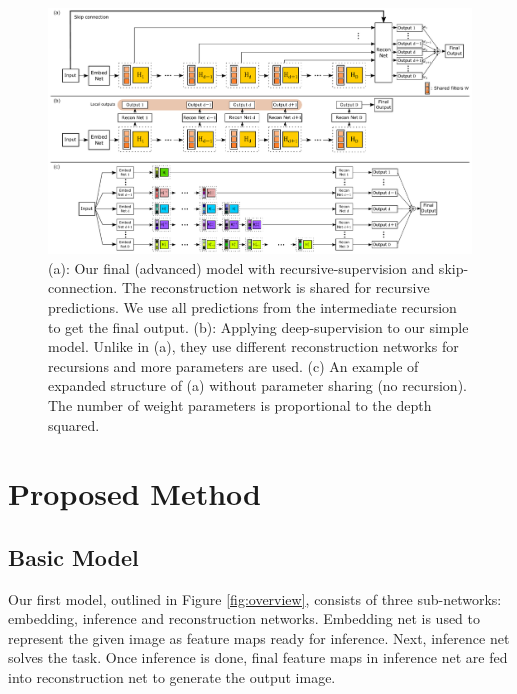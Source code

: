 \documentclass[10pt,twocolumn,letterpaper]{article}
\begin{document}
\begin{figure}[t]
\begin{center}
	\includegraphics[width=\textwidth]{figs/f3}
	\caption{(a): Our final (advanced) model with recursive-supervision and skip-connection. The reconstruction network is shared for recursive predictions. We use all predictions from the intermediate recursion to get the final output. (b): Applying deep-supervision \cite{lee2014deeply} to our simple model. Unlike in (a), they use different reconstruction networks for recursions and more parameters are used.  (c) An example of expanded structure of (a) without parameter sharing (no recursion). The number of weight parameters is proportional to the depth squared. }
\label{fig:recursive_supervision}
\end{center}
\end{figure}

\section{Proposed Method}
\subsection{Basic Model}

Our first model, outlined in Figure \ref{fig:overview}, consists of three sub-networks: embedding, inference and reconstruction networks. Embedding net is used to represent the given image as feature maps ready for inference. Next, inference net solves the task. Once inference is done, final feature maps in inference net are fed into reconstruction net to generate the output image.
\end{document}
